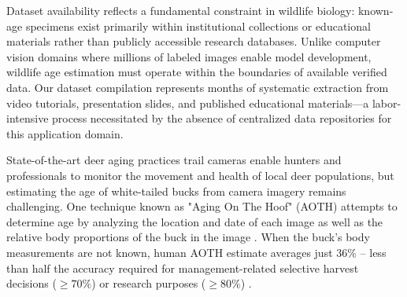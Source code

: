 \documentclass{iopjournal}
\begin{document}
Dataset availability reflects a fundamental constraint in wildlife biology: known-age specimens exist primarily within institutional collections or educational materials rather than publicly accessible research databases. Unlike computer vision domains where millions of labeled images enable model development, wildlife age estimation must operate within the boundaries of available verified data. Our dataset compilation represents months of systematic extraction from video tutorials, presentation slides, and published educational materials—a labor-intensive process necessitated by the absence of centralized data repositories for this application domain.







State-of-the-art deer aging practices trail cameras enable hunters and professionals to monitor the movement and health of local deer populations, but estimating the age of white-tailed bucks from camera imagery remains challenging. One technique known as "Aging On The Hoof" (AOTH) attempts to determine age by analyzing the location and date of each image as well as the relative body proportions of the buck in the image \cite{1996Kroll, 1978Knowlton, 1999Demarais, 2003Richards, 2008Hellickson}. When the buck's body measurements are not known, human AOTH estimate averages just 36\% -- less than half the accuracy required for management-related selective harvest decisions ($\geq70\%$) or research purposes ($\geq80\%$) \cite{2014Gee}. 



\end{document}
